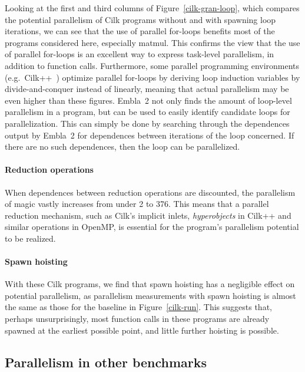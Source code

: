 Looking at the first and third columns of Figure~\ref{cilk-gran-loop}, which
compares the potential parallelism of Cilk programs without and with spawning
loop iterations, we can see that the use of parallel for-loops benefits most of
the programs considered here, especially \textsf{matmul}.
This confirms the view that the use of parallel for-loops is an excellent way to express task-level parallelism, in addition to function calls.
Furthermore, some parallel programming environments (e.g.\ Cilk++~\cite{leiserson09cilk}) optimize parallel for-loops by deriving loop induction variables by divide-and-conquer instead of linearly,
meaning that actual parallelism may be even higher than these figures.
Embla~2 not only finds the amount of loop-level parallelism in a program, but can be used to easily identify candidate loops for parallelization.
This can simply be done by searching through the dependences output by Embla~2 for dependences between iterations of the loop concerned.
If there are no such dependences, then the loop can be parallelized.

\paragraph{Reduction operations}

When dependences between reduction operations are discounted,
the parallelism of \textsf{magic} vastly increases from under 2 to 376.
This means that a parallel reduction mechanism, such as Cilk's implicit inlets, \emph{hyperobjects} in Cilk++ and similar operations in OpenMP,
is essential for the program's parallelism potential to be realized.

\paragraph{Spawn hoisting}

With these Cilk programs, we find that spawn hoisting has a negligible effect on potential parallelism, as parallelism measurements with spawn hoisting is almost the same as those for the baseline in Figure~\ref{cilk-run}.
This suggests that, perhaps unsurprisingly, most function calls in these programs are already spawned at the earliest possible point, and little further hoisting is possible.

\subsection{Parallelism in other benchmarks} \label{sresults:benchmarks}


